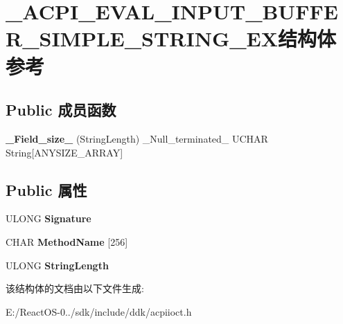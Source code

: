 \hypertarget{struct___a_c_p_i___e_v_a_l___i_n_p_u_t___b_u_f_f_e_r___s_i_m_p_l_e___s_t_r_i_n_g___e_x}{}\section{\+\_\+\+A\+C\+P\+I\+\_\+\+E\+V\+A\+L\+\_\+\+I\+N\+P\+U\+T\+\_\+\+B\+U\+F\+F\+E\+R\+\_\+\+S\+I\+M\+P\+L\+E\+\_\+\+S\+T\+R\+I\+N\+G\+\_\+\+E\+X结构体 参考}
\label{struct___a_c_p_i___e_v_a_l___i_n_p_u_t___b_u_f_f_e_r___s_i_m_p_l_e___s_t_r_i_n_g___e_x}
\subsection*{Public 成员函数}
\begin{DoxyCompactItemize}
\item 
\mbox{\label{struct___a_c_p_i___e_v_a_l___i_n_p_u_t___b_u_f_f_e_r___s_i_m_p_l_e___s_t_r_i_n_g___e_x_a4f33d5aee798516eede42a867d755d95}} 
{\bfseries \+\_\+\+Field\+\_\+size\+\_\+} (String\+Length) \+\_\+\+Null\+\_\+terminated\+\_\+ U\+C\+H\+AR String\mbox{[}A\+N\+Y\+S\+I\+Z\+E\+\_\+\+A\+R\+R\+AY\mbox{]}
\end{DoxyCompactItemize}
\subsection*{Public 属性}
\begin{DoxyCompactItemize}
\item 
\mbox{\label{struct___a_c_p_i___e_v_a_l___i_n_p_u_t___b_u_f_f_e_r___s_i_m_p_l_e___s_t_r_i_n_g___e_x_ad3e8ac4eff6c1860e90afc25b90add58}} 
U\+L\+O\+NG {\bfseries Signature}
\item 
\mbox{\label{struct___a_c_p_i___e_v_a_l___i_n_p_u_t___b_u_f_f_e_r___s_i_m_p_l_e___s_t_r_i_n_g___e_x_a6e4125047cae2d201cf284ecfeee09f2}} 
C\+H\+AR {\bfseries Method\+Name} \mbox{[}256\mbox{]}
\item 
\mbox{\label{struct___a_c_p_i___e_v_a_l___i_n_p_u_t___b_u_f_f_e_r___s_i_m_p_l_e___s_t_r_i_n_g___e_x_af73e1661021e36c0ff6f3a99e6b2b8af}} 
U\+L\+O\+NG {\bfseries String\+Length}
\end{DoxyCompactItemize}


该结构体的文档由以下文件生成\+:\begin{DoxyCompactItemize}
\item 
E\+:/\+React\+O\+S-\/0../sdk/include/ddk/acpiioct.\+h\end{DoxyCompactItemize}

